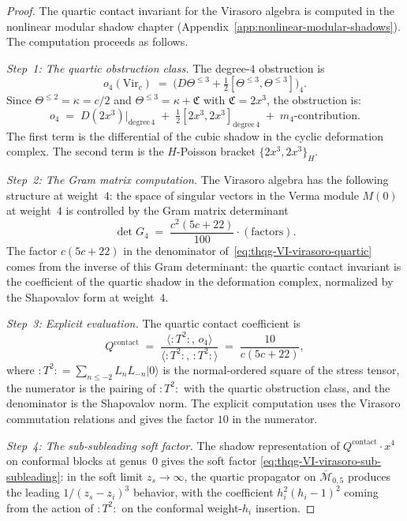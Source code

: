 \begin{proof}
The quartic contact invariant for the Virasoro algebra is
computed in the nonlinear modular shadow chapter
(Appendix~\ref{app:nonlinear-modular-shadows}). The computation
proceeds as follows.

\medskip\noindent
\emph{Step~1: The quartic obstruction class.}\;
The degree-$4$ obstruction is
\[
o_4(\mathrm{Vir}_c)
\;=\;
\bigl(D\Theta^{\leq 3} + \tfrac{1}{2}
[\Theta^{\leq 3}, \Theta^{\leq 3}]\bigr)_4.
\]
Since $\Theta^{\leq 2} = \kappa = c/2$ and
$\Theta^{\leq 3} = \kappa + \mathfrak{C}$ with
$\mathfrak{C} = 2x^3$, the obstruction is:
\[
o_4
\;=\;
D(2x^3)\big|_{\mathrm{degree}\,4}
\;+\;
\tfrac{1}{2}[2x^3, 2x^3]_{\mathrm{degree}\,4}
\;+\;
m_4\text{-contribution}.
\]
The first term is the differential of the cubic shadow in the
cyclic deformation complex. The second term is the
$H$-Poisson bracket $\{2x^3, 2x^3\}_H$.

\medskip\noindent
\emph{Step~2: The Gram matrix computation.}\;
The Virasoro algebra has the following structure at weight~$4$:
the space of singular vectors in the Verma module $M(0)$ at
weight~$4$ is controlled by the Gram matrix determinant
\[
\det G_4 \;=\; \frac{c^2(5c + 22)}{100} \cdot (\text{factors}).
\]
The factor $c(5c + 22)$ in the denominator
of~\eqref{eq:thqg-VI-virasoro-quartic} comes from the inverse of
this Gram determinant: the quartic contact invariant is the
coefficient of the quartic shadow in the deformation complex,
normalized by the Shapovalov form at weight~$4$.

\medskip\noindent
\emph{Step~3: Explicit evaluation.}\;
The quartic contact coefficient is
\[
Q^{\mathrm{contact}}
\;=\;
\frac{\langle :T^2:,\, o_4 \rangle}
 {\langle :T^2:,\, :T^2: \rangle}
\;=\;
\frac{10}{c(5c + 22)},
\]
where $:T^2: = \sum_{n \leq -2} L_n L_{-n} |0\rangle$ is the
normal-ordered square of the stress tensor, the numerator is the
pairing of $:T^2:$ with the quartic obstruction class, and the
denominator is the Shapovalov norm. The explicit computation uses
the Virasoro commutation relations and gives the factor $10$ in the
numerator.

\medskip\noindent
\emph{Step~4: The sub-subleading soft factor.}\;
The shadow representation of $Q^{\mathrm{contact}}\cdot x^4$
on conformal blocks at genus~$0$ gives the soft factor
\eqref{eq:thqg-VI-virasoro-sub-subleading}: in the soft limit
$z_s \to \infty$, the quartic propagator on
$\overline{\mathcal{M}}_{0,5}$ produces the leading
$1/(z_s - z_i)^3$ behavior, with the coefficient
$h_i^2(h_i-1)^2$ coming from the action of $:T^2:$ on the
conformal weight-$h_i$ insertion.
\end{proof}

